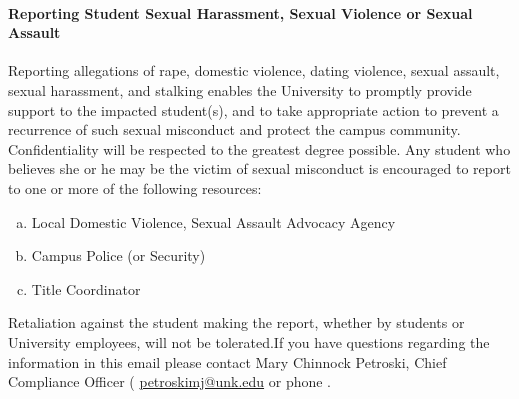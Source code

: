 \documentclass[12pt]{article}
\newcounter{ex}\setcounter{ex}{0}
\newenvironment{alphalist}{
  \begin{enumerate}[(a)]
    \addtolength{\itemsep}{-0.5\itemsep}}
  {\end{enumerate}}
\newcommand{\RomanNumeralCaps}[1]
      {\MakeUppercase{\romannumeral #1}}
\begin{document}
\paragraph{Reporting Student Sexual Harassment, Sexual Violence or Sexual Assault} Reporting allegations of rape, domestic violence, dating violence, sexual assault, sexual harassment, and stalking enables the University to promptly provide support to the impacted student(s), and to take appropriate action to prevent a recurrence of such sexual misconduct and protect the campus community. Confidentiality will be respected to the greatest degree possible. Any student who believes she or he may be the victim of sexual misconduct is encouraged to report to one or more of the following resources:
\begin{alphalist}
\item Local Domestic Violence, Sexual Assault Advocacy Agency 

\item Campus Police (or Security) 

\item Title \RomanNumeralCaps{9} Coordinator 

\end{alphalist}
Retaliation against the student making the report, whether by students or University employees, will not be tolerated.If you have questions regarding the information in this email please 
contact Mary Chinnock Petroski, Chief Compliance Officer (
   \href{mailto:petroskimj@unk.edu}{petroskimj@unk.edu} 
    or phone .
\end{document}
